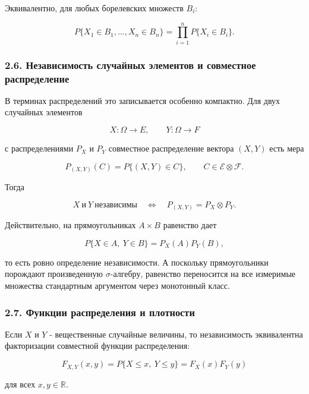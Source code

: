 \documentclass[
  11pt,
  a4paper,
]{article}
\begin{document}
Эквивалентно, для любых борелевских множеств \(B_i\):

\[
P\{X_1\in B_1,\ldots,X_n\in B_n\}
=
\prod_{i=1}^n P\{X_i\in B_i\}.
\]

\subsubsection{2.6. Независимость случайных элементов и совместное
распределение}\label{ux43dux435ux437ux430ux432ux438ux441ux438ux43cux43eux441ux442ux44c-ux441ux43bux443ux447ux430ux439ux43dux44bux445-ux44dux43bux435ux43cux435ux43dux442ux43eux432-ux438-ux441ux43eux432ux43cux435ux441ux442ux43dux43eux435-ux440ux430ux441ux43fux440ux435ux434ux435ux43bux435ux43dux438ux435}

В терминах распределений это записывается особенно компактно. Для двух
случайных элементов

\[
X:\Omega\to E,
\qquad
Y:\Omega\to F
\]

с распределениями \(P_X\) и \(P_Y\) совместное распределение вектора
\((X,Y)\) есть мера

\[
P_{(X,Y)}(C)=P\{(X,Y)\in C\},
\qquad
C\in\mathcal E\otimes\mathcal F.
\]

Тогда

\[
X\ \text{и}\ Y\ \text{независимы}
\quad\Longleftrightarrow\quad
P_{(X,Y)}=P_X\otimes P_Y.
\]

Действительно, на прямоугольниках \(A\times B\) равенство дает

\[
P\{X\in A,\ Y\in B\}
=
P_X(A)P_Y(B),
\]

то есть ровно определение независимости. А поскольку прямоугольники
порождают произведенную \(\sigma\)-алгебру, равенство переносится на все
измеримые множества стандартным аргументом через монотонный класс.

\subsubsection{2.7. Функции распределения и
плотности}\label{ux444ux443ux43dux43aux446ux438ux438-ux440ux430ux441ux43fux440ux435ux434ux435ux43bux435ux43dux438ux44f-ux438-ux43fux43bux43eux442ux43dux43eux441ux442ux438}

Если \(X\) и \(Y\) - вещественные случайные величины, то независимость
эквивалентна факторизации совместной функции распределения:

\[
F_{X,Y}(x,y)
=
P\{X\le x,\ Y\le y\}
=
F_X(x)F_Y(y)
\]

для всех \(x,y\in\mathbb R\).
\end{document}
